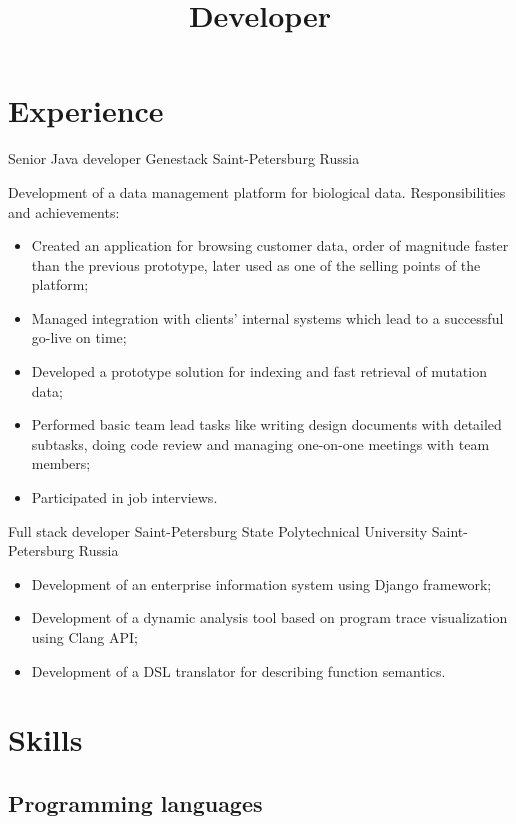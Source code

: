 \documentclass{moderncv}
\title{Developer}
\begin{document}
\makecvtitle

\section{Experience}

        {Senior Java developer}
        {Genestack}
        {Saint-Petersburg}
        {Russia}
        {Development of a data management platform for biological data. \newline{} Responsibilities and achievements:
        \begin{itemize}
            \item Created an application for browsing customer data, order of magnitude faster than the previous prototype, later
            used as one of the selling points of the platform;
            \item Managed integration with clients' internal systems which lead to a successful go-live on time;
            \item Developed a prototype solution for indexing and fast retrieval of mutation data;
            \item Performed basic team lead tasks like writing design documents with detailed subtasks, doing code review 
            and managing one-on-one meetings with team members;   
            \item Participated in job interviews.
        \end{itemize}}

        {Full stack developer}
        {Saint-Petersburg State Polytechnical University}
        {Saint-Petersburg}
        {Russia}
        {\begin{itemize}
            \item Development of an enterprise information system using Django framework;
            \item Development of a dynamic analysis tool based on program trace visualization using Clang API;
            \item Development of a DSL translator for describing function semantics.
        \end{itemize}}

\section{Skills}

\subsection{Programming languages}
\end{document}
